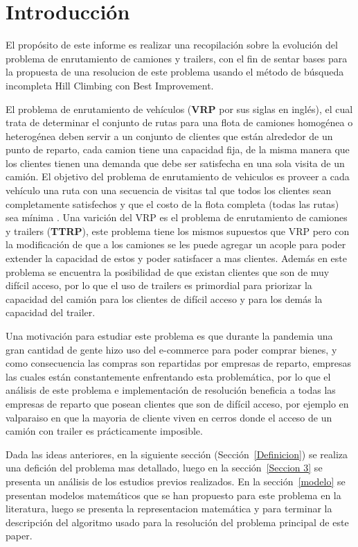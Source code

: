 \documentclass[letter, 10pt]{article}
\begin{document}
\section{Introducci\'on}
El prop\'osito de este informe es realizar una recopilaci\'on sobre la evolución del problema de enrutamiento de camiones y trailers, con el fin de sentar bases para la propuesta de una resolucion de este problema usando el método de búsqueda incompleta Hill Climbing con Best Improvement. 

El problema de enrutamiento de veh\'iculos (\textbf{VRP} por sus siglas en ingl\'es), el cual trata de determinar el conjunto de rutas para una flota de camiones homogénea o heterogénea deben servir a un conjunto de clientes que están alrededor de un punto de reparto, cada camion tiene una capacidad fija, de la misma manera que los clientes tienen una demanda que debe ser satisfecha en una sola visita de un camión. El objetivo del problema de enrutamiento de vehiculos es proveer a cada vehículo una ruta con una secuencia de visitas tal que todos los clientes sean completamente satisfechos y que el costo de la flota completa (todas las rutas) sea mínima . Una varici\'on del VRP es el problema de enrutamiento de camiones y trailers (\textbf{TTRP}), este problema tiene los mismos supuestos que VRP pero con la modificación de que a los camiones se les puede agregar un acople  para poder extender la capacidad  de estos  y poder satisfacer a mas clientes. Además en este problema se encuentra la posibilidad de que existan clientes que son de muy difícil acceso, por lo que el uso de trailers es primordial para priorizar la capacidad del camión para los clientes de difícil acceso y para los demás la capacidad del trailer.

Una motivaci\'on para estudiar este problema es que durante la pandemia una gran cantidad de gente hizo uso del e-commerce para poder comprar bienes, y como consecuencia las compras son repartidas por empresas de reparto, empresas las cuales est\'an constantemente enfrentando esta problem\'atica, por lo que el análisis de este problema e implementación de resolución beneficia a todas las empresas de reparto que posean clientes que son de difícil acceso, por ejemplo en valparaiso en que la mayoria de cliente viven en  cerros donde el acceso de un camión con trailer es prácticamente imposible.

Dada las ideas anteriores, en la siguiente secci\'on (Secci\'on~\ref{Definicion}) se realiza una defici\'on del problema mas detallado, luego en la secci\'on~\ref{Seccion 3}  se presenta un an\'alisis de los estudios previos realizados. En la secci\'on~\ref{modelo} se presentan modelos matem\'aticos que se han propuesto para este problema en la literatura, luego se presenta la representacion matemática  y para terminar la descripción del algoritmo usado para la resolución del problema principal de este paper.
\end{document}
